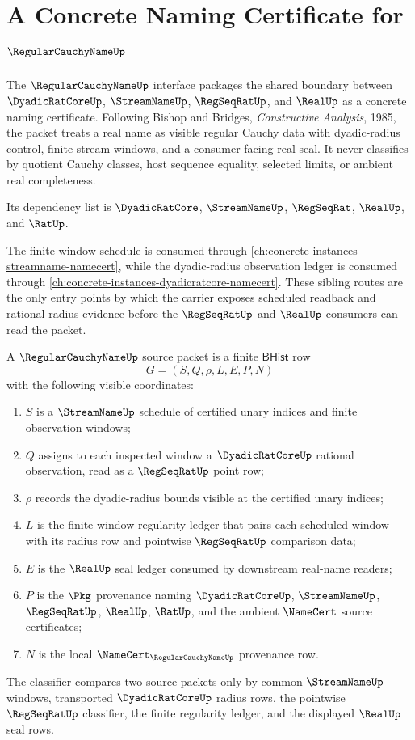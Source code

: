 \chapter{A Concrete Naming Certificate for $\RegularCauchyNameUp$}
\label{ch:concrete-instances-regular-cauchy-name-namecert}

The $\RegularCauchyNameUp$ interface packages the shared boundary between $\DyadicRatCoreUp$, $\StreamNameUp$, $\RegSeqRatUp$, and $\RealUp$ as a concrete naming certificate. Following Bishop and Bridges, \emph{Constructive Analysis}, 1985, the packet treats a real name as visible regular Cauchy data with dyadic-radius control, finite stream windows, and a consumer-facing real seal. It never classifies by quotient Cauchy classes, host sequence equality, selected limits, or ambient real completeness.

Its dependency list is $\DyadicRatCore$, $\StreamNameUp$, $\RegSeqRat$, $\RealUp$, and $\RatUp$.

The finite-window schedule is consumed through \autoref{ch:concrete-instances-streamname-namecert}, while the dyadic-radius observation ledger is consumed through \autoref{ch:concrete-instances-dyadicratcore-namecert}. These sibling routes are the only entry points by which the carrier exposes scheduled readback and rational-radius evidence before the $\RegSeqRatUp$ and $\RealUp$ consumers can read the packet.

\begin{definition}
\label{def:regularcauchyname-namecert-source}
A $\RegularCauchyNameUp$ source packet is a finite $\mathsf{BHist}$ row
$$
G=(S,Q,\rho,L,E,P,N)
$$
with the following visible coordinates:
\begin{enumerate}
\item $S$ is a $\StreamNameUp$ schedule of certified unary indices and finite observation windows;
\item $Q$ assigns to each inspected window a $\DyadicRatCoreUp$ rational observation, read as a $\RegSeqRatUp$ point row;
\item $\rho$ records the dyadic-radius bounds visible at the certified unary indices;
\item $L$ is the finite-window regularity ledger that pairs each scheduled window with its radius row and pointwise $\RegSeqRatUp$ comparison data;
\item $E$ is the $\RealUp$ seal ledger consumed by downstream real-name readers;
\item $P$ is the $\Pkg$ provenance naming $\DyadicRatCoreUp$, $\StreamNameUp$, $\RegSeqRatUp$, $\RealUp$, $\RatUp$, and the ambient $\NameCert$ source certificates;
\item $N$ is the local $\NameCert_{\RegularCauchyNameUp}$ provenance row.
\end{enumerate}
The classifier compares two source packets only by common $\StreamNameUp$ windows, transported $\DyadicRatCoreUp$ radius rows, the pointwise $\RegSeqRatUp$ classifier, the finite regularity ledger, and the displayed $\RealUp$ seal rows.
\end{definition}

